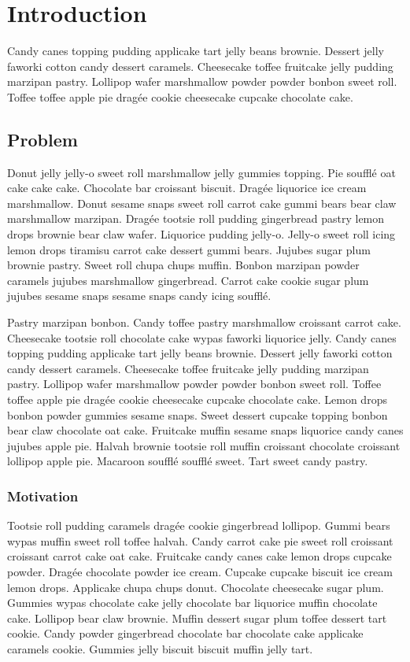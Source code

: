 \chapter{Introduction}
Candy canes topping pudding applicake tart jelly beans brownie. Dessert jelly faworki cotton candy dessert caramels. Cheesecake toffee fruitcake jelly pudding marzipan pastry. Lollipop wafer marshmallow powder powder bonbon sweet roll. Toffee toffee apple pie dragée cookie cheesecake cupcake chocolate cake.

\section{Problem}

Donut jelly jelly-o sweet roll marshmallow jelly gummies topping. Pie soufflé oat cake cake cake. Chocolate bar croissant biscuit. Dragée liquorice ice cream marshmallow. Donut sesame snaps sweet roll carrot cake gummi bears bear claw marshmallow marzipan. Dragée tootsie roll pudding gingerbread pastry lemon drops brownie bear claw wafer. Liquorice pudding jelly-o. Jelly-o sweet roll icing lemon drops tiramisu carrot cake dessert gummi bears. Jujubes sugar plum brownie pastry. Sweet roll chupa chups muffin. Bonbon marzipan powder caramels jujubes marshmallow gingerbread. Carrot cake cookie sugar plum jujubes sesame snaps sesame snaps candy icing soufflé.

Pastry marzipan bonbon. Candy toffee pastry marshmallow croissant carrot cake. Cheesecake tootsie roll chocolate cake wypas faworki liquorice jelly. Candy canes topping pudding applicake tart jelly beans brownie. Dessert jelly faworki cotton candy dessert caramels. Cheesecake toffee fruitcake jelly pudding marzipan pastry. Lollipop wafer marshmallow powder powder bonbon sweet roll. Toffee toffee apple pie dragée cookie cheesecake cupcake chocolate cake. Lemon drops bonbon powder gummies sesame snaps. Sweet dessert cupcake topping bonbon bear claw chocolate oat cake. Fruitcake muffin sesame snaps liquorice candy canes jujubes apple pie. Halvah brownie tootsie roll muffin croissant chocolate croissant lollipop apple pie. Macaroon soufflé soufflé sweet. Tart sweet candy pastry.

\subsection{Motivation}

Tootsie roll pudding caramels dragée cookie gingerbread lollipop. Gummi bears wypas muffin sweet roll toffee halvah. Candy carrot cake pie sweet roll croissant croissant carrot cake oat cake. Fruitcake candy canes cake lemon drops cupcake powder. Dragée chocolate powder ice cream. Cupcake cupcake biscuit ice cream lemon drops. Applicake chupa chups donut. Chocolate cheesecake sugar plum. Gummies wypas chocolate cake jelly chocolate bar liquorice muffin chocolate cake. Lollipop bear claw brownie. Muffin dessert sugar plum toffee dessert tart cookie. Candy powder gingerbread chocolate bar chocolate cake applicake caramels cookie. Gummies jelly biscuit biscuit muffin jelly tart.

